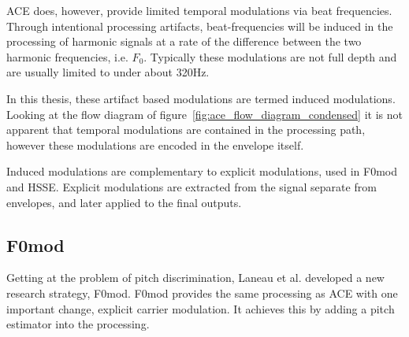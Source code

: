\documentclass [11pt, proquest,oneside] {ganter_thesis}[2015/03/03]
\begin{document}



ACE does, however, provide limited temporal modulations via beat frequencies.  Through intentional processing artifacts, beat-frequencies will be induced in the processing of harmonic signals at a rate of the difference between the two harmonic frequencies, i.e. $F_0$.  Typically these modulations are not full depth and are usually limited to under about 320Hz.

In this thesis, these artifact based modulations are termed induced modulations.  Looking at the flow diagram of figure~\ref{fig:ace_flow_diagram_condensed} it is not apparent that temporal modulations are contained in the processing path, however these modulations are encoded in the envelope itself.

Induced modulations are complementary to explicit modulations, used in F0mod and HSSE.  Explicit modulations are extracted from the signal separate from envelopes, and later applied to the final outputs.

\subsection{F0mod}

Getting at the problem of pitch discrimination, Laneau et al. \cite{laneau2006improved} developed a new research strategy, F0mod.  F0mod provides the same processing as ACE with one important change, explicit carrier modulation.  It achieves this by adding a pitch estimator into the processing.
\end{document}
